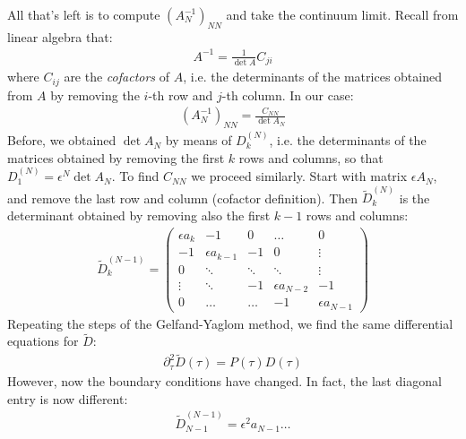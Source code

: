 \documentclass[../template.tex]{subfiles}
\begin{document}
All that's left is to compute $(A_N^{-1})_{NN}$ and take the continuum limit. Recall from linear algebra that:
\begin{align*}
    A^{-1} = \frac{1}{\operatorname{det}A } C_{ji} 
\end{align*} 
where $C_{ij}$ are the \textit{cofactors} of $A$, i.e. the determinants of the matrices obtained from $A$ by removing the $i$-th row and $j$-th column. In our case:
\begin{align*}
    (A_N^{-1})_{NN} = \frac{C_{NN}}{\operatorname{det} A_N} 
\end{align*}      
Before, we obtained $\operatorname{det} A_N$ by means of $D_k^{(N)}$, i.e. the determinants of the matrices obtained by removing the first $k$ rows and columns, so that $D_1^{(N)} = \epsilon^N \operatorname{det} A_N$. To find $C_{NN}$ we proceed similarly. Start with matrix $\epsilon A_N$, and remove the last row and column (cofactor definition). Then $\tilde{D}_k^{(N)}$ is the determinant obtained by removing also the first $k-1$ rows and columns:
\begin{align*}
    \tilde{D}_{k}^{(N-1)} = \left(\begin{array}{ccccc}
    \epsilon a_k & -1 & 0 & \dots & 0 \\ 
    -1 & \epsilon a_{k-1} & -1 & 0 & \vdots \\ 
    0 & \ddots & \ddots & \ddots & \vdots \\ 
    \vdots & \ddots & -1 & \epsilon a_{N-2} & -1 \\ 
    0 & \dots & \dots & -1 & \epsilon a_{N-1}
    \end{array}\right)
\end{align*}   
Repeating the steps of the Gelfand-Yaglom method, we find the same differential equations for $\tilde{D}$:
\begin{align*}
    \partial_\tau^2 \tilde{D}(\tau) = P(\tau) D(\tau)
\end{align*}  
However, now the boundary conditions have changed. In fact, the last diagonal entry is now different:
\begin{align*}
    \tilde{D}_{N-1}^{(N-1)} = \epsilon^2 a_{N-1} \dots 
\end{align*}




 
\end{document}
